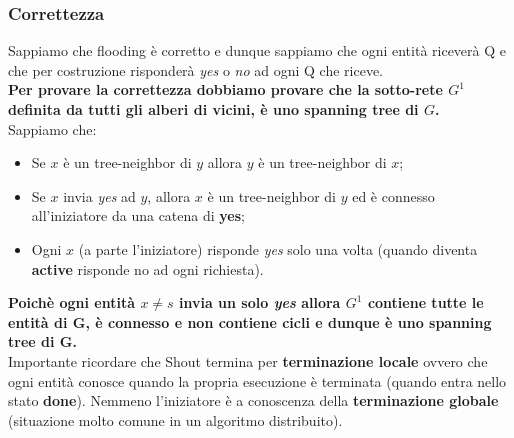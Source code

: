 \documentclass[12pt]{article}
\begin{document}
		\subsubsection{Correttezza}
			Sappiamo che flooding è corretto e dunque sappiamo che ogni entità riceverà Q e che per costruzione risponderà \textit{yes} o \textit{no} ad ogni Q che riceve.\\ 
			\textbf{ Per provare la correttezza dobbiamo provare che la sotto-rete $G^{1}$ definita da tutti gli alberi di vicini, è uno spanning tree di $G$.}\\
			Sappiamo che:
			\begin{itemize}
				\item Se $x$ è un tree-neighbor di $y$ allora $y$ è un tree-neighbor di $x$;
				\item Se $x$ invia \textit{yes}	ad $y$, allora $x$ è un tree-neighbor di $y$ ed è connesso all'iniziatore da una catena di \textbf{yes};
				\item Ogni $x$ (a parte l'iniziatore) risponde \textit{yes} solo una volta (quando diventa \textbf{active} risponde no ad ogni richiesta).
			\end{itemize}
			\textbf{Poichè ogni entità $x \neq s$ invia un solo \textit{yes} allora $G^{1}$ contiene tutte le entità di G, è connesso e non contiene cicli e dunque è uno spanning tree di G.}\\
			Importante ricordare che Shout termina per \textbf{terminazione locale} ovvero che ogni entità conosce quando la propria esecuzione è terminata (quando entra nello stato \textbf{done}). Nemmeno l'iniziatore è a conoscenza della \textbf{terminazione globale} (situazione molto comune in un algoritmo distribuito).
\end{document}
